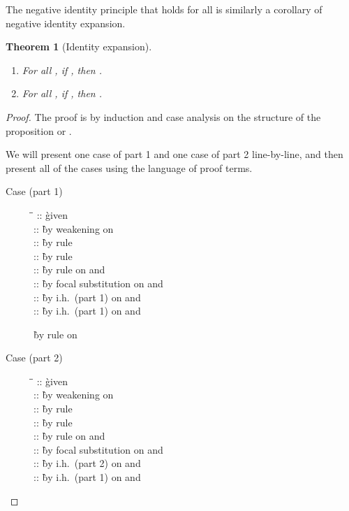 \documentclass[acmtocl]{robtrans}\pdfoutput=1
\newtheorem{theorem}{Theorem}
\begin{document}
 The negative identity principle that 
 holds for all  is similarly a corollary of negative identity
 expansion.


\begin{theorem}[Identity expansion]\label{thm:identity}~
\begin{enumerate}
\item For all , if , 
then . 
\item For all , if ,
then . 
\end{enumerate}
\end{theorem}

\begin{proof}
The proof is by induction and case analysis on the structure of the
proposition  or .  

We will present one case of part 1 and
one case of part 2 line-by-line, and then present all of the cases
using the language of proof terms.


\begin{description}
\item[Case (part 1)] 
\begin{tabbing}
\qquad \=  \= \kill
\>
 \> :: 
  \` given \\
\>
 \> :: 
  \` by weakening on \\
\>
 \> :: 
  \` by rule \\
\>
 \> :: 
  \` by rule \\
\>
 \> :: 
  \` by rule  on  and \\
\>
 \> :: 
  \` by focal substitution on  and \\
\>
 \> :: 
  \` by i.h.~(part 1) on  and \\
\>
 \> :: 
  \` by i.h.~(part 1) on  and \\
\>

  \` by rule  on 
\end{tabbing}

\item[Case (part 2)] 
\begin{tabbing}
\qquad \=  \= \kill
\>
 \> :: 
  \` given \\
\>
 \> :: 
  \` by weakening on \\
\>
 \> :: 
  \` by rule \\
\>
 \> :: 
  \` by rule \\
\>
 \> :: 
  \` by rule  on  and \\
\>
 \> :: 
  \` by focal substitution on  and \\
\>
 \> :: 
  \` by i.h.~(part 2) on  and \\
\>
 \> :: 
  \` by i.h.~(part 1) on  and \\
\>


\end{tabbing}
\end{description}
\end{proof}
\end{document}
